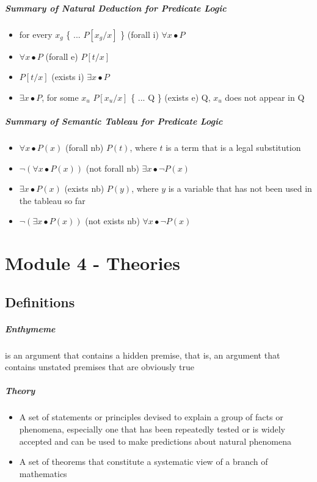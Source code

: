 \documentclass[12pt]{report}
\begin{document}
    \paragraph{Summary of Natural Deduction for Predicate Logic}
    \begin{itemize}
      \item for every $x_g$ \{ ... $P[x_g / x]$ \} (forall i) $\forall x
        \bullet P$
      \item $\forall x \bullet P$ (forall e) $P[t/x]$
      \item $P[t/x]$ (exists i) $\exists x \bullet P$
      \item $\exists x \bullet P$, for some $x_u$ $P[x_u/x]$ \{ ... Q \}
        (exists e) Q, $x_u$ does not appear in Q
    \end{itemize}

    \paragraph{Summary of Semantic Tableau for Predicate Logic}
    \begin{itemize}
      \item $\forall x \bullet P(x)$ (forall nb) $P(t)$, where $t$ is a term
        that is a legal substitution
      \item $\lnot(\forall x \bullet P(x))$ (not forall nb) $\exists x \bullet
        \lnot P(x)$
      \item $\exists x \bullet P(x)$ (exists nb) $P(y)$, where $y$ is a
        variable that has not been used in the tableau so far
      \item $\lnot(\exists x \bullet P(x))$ (not exists nb) $\forall x \bullet
        \lnot P(x)$
    \end{itemize}

\chapter{Module 4 - Theories}
  \section{Definitions}
    \paragraph{Enthymeme} is an argument that contains a hidden premise, that
    is, an argument that contains unstated premises that are obviously true

    \paragraph{Theory}
    \begin{itemize}
      \item A set of statements or principles devised to explain a group of
      facts or phenomena, especially one that has been repeatedly tested or is
      widely accepted and can be used to make predictions about natural
      phenomena
      \item A set of theorems that constitute a systematic view of a branch of
      mathematics
    \end{itemize}
\end{document}
